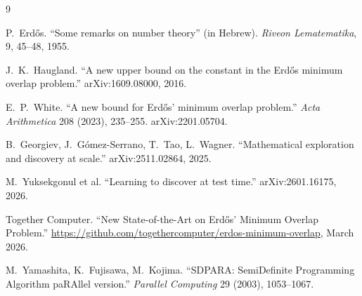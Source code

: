 \documentclass[11pt]{article}
\theoremstyle{plain}
\theoremstyle{definition}
\begin{document}

\begin{thebibliography}{9}

P.~Erd\H{o}s.
``Some remarks on number theory'' (in Hebrew).
\textit{Riveon Lematematika}, 9, 45–48, 1955.

J.~K.~Haugland.
``A new upper bound on the constant in the Erd\H{o}s minimum overlap problem.''
arXiv:1609.08000, 2016.

E.~P.~White.
``A new bound for Erd\H{o}s' minimum overlap problem.''
\textit{Acta Arithmetica} 208 (2023), 235--255. arXiv:2201.05704.

B.~Georgiev, J.~G\'omez-Serrano, T.~Tao, L.~Wagner.
``Mathematical exploration and discovery at scale.''
arXiv:2511.02864, 2025.

M.~Yuksekgonul et al.
``Learning to discover at test time.''
arXiv:2601.16175, 2026.

Together Computer.
``New State-of-the-Art on Erd\H{o}s' Minimum Overlap Problem.''
\url{https://github.com/togethercomputer/erdos-minimum-overlap}, March 2026.

M.~Yamashita, K.~Fujisawa, M.~Kojima.
``SDPARA: SemiDefinite Programming Algorithm paRAllel version.''
\textit{Parallel Computing} 29 (2003), 1053--1067.

\end{thebibliography}
\end{document}
